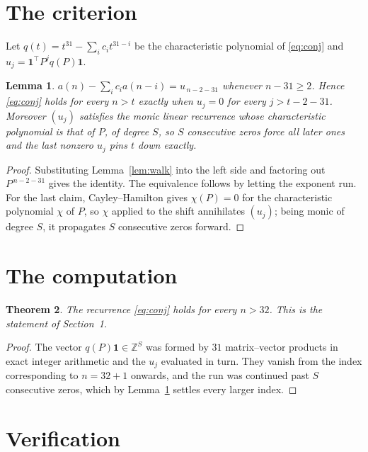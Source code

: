 \documentclass[11pt,a4paper]{article}
\theoremstyle{plain}
\newtheorem{theorem}{Theorem}
\newtheorem{lemma}[theorem]{Lemma}
\theoremstyle{definition}
\begin{document}
\section{The criterion}

Let $q(t)=t^{31}-\sum_i c_i t^{31-i}$ be the characteristic polynomial of
\eqref{eq:conj} and $u_j=\mathbf{1}^{\!\top}P^{j}q(P)\mathbf{1}$.

\begin{lemma}\label{lem:crit}
$a(n)-\sum_i c_i a(n-i)=u_{\,n-2-31}$ whenever $n-31\ge2$. Hence
\eqref{eq:conj} holds for every $n>t$ exactly when $u_j=0$ for every
$j>t-2-31$. Moreover $(u_j)$ satisfies the monic linear recurrence whose
characteristic polynomial is that of $P$, of degree $S$, so $S$ consecutive zeros force all
later ones and the last nonzero $u_j$ pins $t$ down exactly.
\end{lemma}

\begin{proof}
Substituting Lemma~\ref{lem:walk} into the left side and factoring out
$P^{\,n-2-31}$ gives the identity. The equivalence follows by letting the exponent
run. For the last claim, Cayley--Hamilton gives $\chi(P)=0$ for the characteristic
polynomial $\chi$ of $P$, so $\chi$ applied to the shift annihilates $(u_j)$; being monic of
degree $S$, it propagates $S$ consecutive zeros forward.
\end{proof}

\section{The computation}

\begin{theorem}
The recurrence \eqref{eq:conj} holds for every $n>32$. This is the statement of
Section~1.
\end{theorem}

\begin{proof}
The vector $q(P)\mathbf{1}\in\mathbb{Z}^{S}$ was formed by $31$ matrix--vector
products in exact integer arithmetic and the $u_j$ evaluated in turn. They vanish from the
index corresponding to $n=32+1$ onwards, and the run was continued past $S$ consecutive
zeros, which by Lemma~\ref{lem:crit} settles every larger index.
\end{proof}

\section{Verification}
\end{document}
